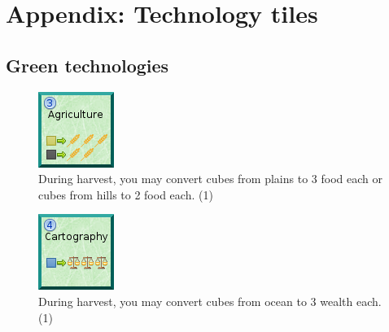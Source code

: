 \documentclass[11pt,a4paper,titlepage]{article}
\begin{document}
\section{Appendix: Technology tiles}{
  \subsection{Green technologies}{

  \begin{figure}[!htb]
    \begin{minipage}[c]{0.1\textwidth}
      \includegraphics[scale=.7]{doe_tech_agriculture.png}
    \end{minipage}\hfill
    \begin{minipage}[c]{0.6\textwidth}
      \captionsetup{labelformat=empty, justification=justified, singlelinecheck=false}
      \caption{During harvest, you may convert cubes from plains to 3 food each or cubes from hills to 2 food each. (1)}
    \end{minipage}\hfill
    \label{fig:tech_agriculture}
  \end{figure}

  \begin{figure}[!htb]
    \begin{minipage}[c]{0.1\textwidth}
      \includegraphics[scale=.7]{doe_tech_cartography.png}
    \end{minipage}\hfill
    \begin{minipage}[c]{0.6\textwidth}
      \captionsetup{labelformat=empty, justification=justified, singlelinecheck=false}
      \caption{During harvest, you may convert cubes from ocean to 3 wealth each. (1)}
    \end{minipage}\hfill
    \label{fig:tech_cartography}
  \end{figure}

}}
\end{document}
